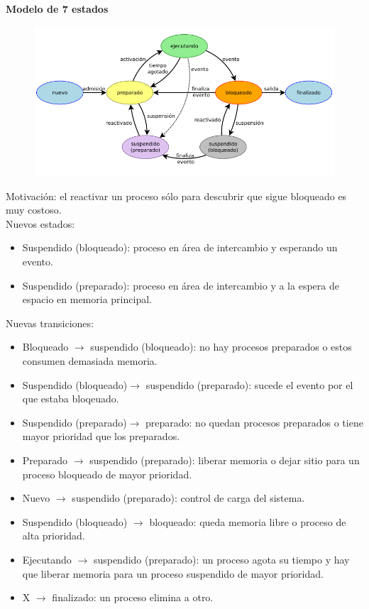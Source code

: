 \documentclass{article}
\begin{document}
\newpage
\textbf{Modelo de 7 estados}
\begin{figure}[h]
\centering
\includegraphics[scale=1, width=\textwidth]{7_estados.png}
\end{figure}

Motivación: el reactivar un proceso sólo para descubrir que sigue bloqueado es muy costoso.\\

Nuevos estados:
\begin{itemize}
\item Suspendido (bloqueado): proceso en área de intercambio y esperando un evento.

\item Suspendido (preparado): proceso en área de intercambio y a la espera de espacio en memoria principal.
\end{itemize}

Nuevas transiciones:
\begin{itemize}
\item Bloqueado $\rightarrow$ suspendido (bloqueado): no hay procesos preparados o estos consumen demasiada memoria.

\item Suspendido (bloqueado)$\rightarrow$ suspendido (preparado): sucede el evento por el que estaba bloqeuado.

\item Suspendido (preparado)$\rightarrow$ preparado: no quedan procesos preparados o tiene mayor prioridad que los preparados.

\item Preparado $\rightarrow$ suspendido (preparado): liberar memoria o dejar sitio para un proceso bloqueado de mayor prioridad.

\item Nuevo $\rightarrow$ suspendido (preparado): control de carga del sistema.

\item Suspendido (bloqueado) $\rightarrow $ bloqueado: queda memoria libre o proceso de alta prioridad.

\item Ejecutando $\rightarrow$ suspendido (preparado): un proceso agota su tiempo y hay que liberar memoria para un proceso suspendido de mayor prioridad.

\item X $\rightarrow$ finalizado: un proceso elimina a otro.
\end{itemize}
\end{document}
